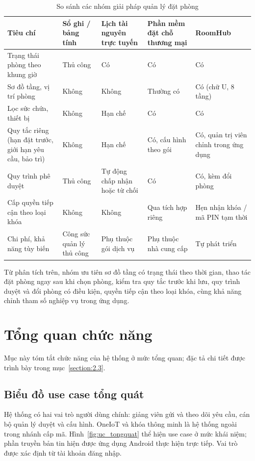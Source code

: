 \documentclass[../DoAn.tex]{subfiles}
\begin{document}
\begin{table}[H]
\centering\small
\renewcommand{\arraystretch}{1.2}
\caption{So sánh các nhóm giải pháp quản lý đặt phòng}
\label{tab:sosanh}
\begin{tabularx}{\textwidth}{|p{3.6cm}|X|X|X|X|}
\hline
\textbf{Tiêu chí} & \textbf{Sổ ghi / bảng tính} & \textbf{Lịch tài nguyên trực tuyến} & \textbf{Phần mềm đặt chỗ thương mại} & \textbf{RoomHub} \\ \hline
Trạng thái phòng theo khung giờ & Thủ công & Có & Có & Có \\ \hline
Sơ đồ tầng, vị trí phòng & Không & Không & Thường có & Có (chữ U, 8 tầng) \\ \hline
Lọc sức chứa, thiết bị & Không & Hạn chế & Có & Có \\ \hline
Quy tắc riêng (hạn đặt trước, giới hạn yêu cầu, bảo trì) & Không & Hạn chế & Có, cấu hình theo gói & Có, quản trị viên chỉnh trong ứng dụng \\ \hline
Quy trình phê duyệt & Thủ công & Tự động chấp nhận hoặc từ chối & Có & Có, kèm đổi phòng \\ \hline
Cấp quyền tiếp cận theo loại khóa & Không & Không & Qua tích hợp riêng & Hẹn nhận khóa / mã PIN tạm thời \\ \hline
Chi phí, khả năng tùy biến & Công sức quản lý thủ công & Phụ thuộc gói dịch vụ & Phụ thuộc nhà cung cấp & Tự phát triển \\ \hline
\end{tabularx}
\end{table}

Từ phân tích trên, nhóm ưu tiên sơ đồ tầng có trạng thái theo thời gian, thao tác đặt phòng ngay sau khi chọn phòng, kiểm tra quy tắc trước khi lưu, quy trình duyệt và đổi phòng có điều kiện, quyền tiếp cận theo loại khóa, cùng khả năng chỉnh tham số nghiệp vụ trong ứng dụng.

\section{Tổng quan chức năng}
\label{section:2.2}
Mục này tóm tắt chức năng của hệ thống ở mức tổng quan; đặc tả chi tiết được trình bày trong mục~\ref{section:2.3}.

\subsection{Biểu đồ use case tổng quát}
\label{subsection:2.2.1}
Hệ thống có hai vai trò người dùng chính: giảng viên gửi và theo dõi yêu cầu, cán bộ quản lý duyệt và cấu hình. OneIoT và khóa thông minh là hệ thống ngoài trong nhánh cấp mã. Hình~\ref{fig:uc_tongquat} thể hiện use case ở mức khái niệm; phần truyền bản tin hiện được ứng dụng Android thực hiện trực tiếp. Vai trò được xác định từ tài khoản đăng nhập.
\end{document}
